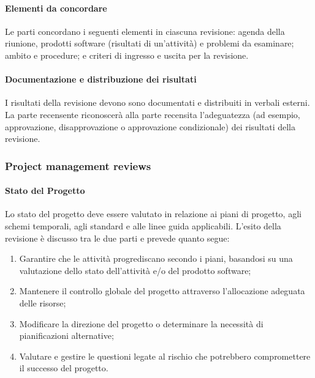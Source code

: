 \paragraph{Elementi da concordare}
Le parti concordano i seguenti elementi in ciascuna revisione: agenda della riunione, prodotti software (risultati di un'attività) e problemi da esaminare; ambito e procedure; e criteri di ingresso e uscita per la revisione.


\paragraph{Documentazione e distribuzione dei risultati}
I risultati della revisione devono sono documentati e distribuiti in verbali esterni. La parte recensente riconoscerà alla parte recensita l'adeguatezza (ad esempio, approvazione, disapprovazione o approvazione condizionale) dei risultati della revisione.

\subsubsection{Project management reviews}
\paragraph{Stato del Progetto}
Lo stato del progetto deve essere valutato in relazione ai piani di progetto, agli schemi temporali, agli standard e alle linee guida applicabili. L'esito della revisione è discusso tra le due parti e prevede quanto segue:
\begin{enumerate}
  \item Garantire che le attività progrediscano secondo i piani, basandosi su una valutazione dello stato dell'attività e/o del prodotto software;
  \item Mantenere il controllo globale del progetto attraverso l'allocazione adeguata delle risorse;
  \item Modificare la direzione del progetto o determinare la necessità di pianificazioni alternative;
  \item Valutare e gestire le questioni legate al rischio che potrebbero compromettere il successo del progetto.
\end{enumerate}


